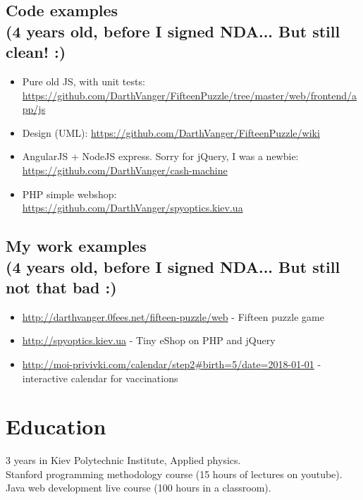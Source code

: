 \documentclass[a4paper, 14pt]{article}
\begin{document}
  \subsection{Code examples \\(4 years old, before I signed NDA... But still clean! :)}
  \begin{itemize}
    \item Pure old JS, with unit tests: \url{https://github.com/DarthVanger/FifteenPuzzle/tree/master/web/frontend/app/js}
    \\
  \item Design (UML): \url{https://github.com/DarthVanger/FifteenPuzzle/wiki}
    \\
    \item AngularJS + NodeJS express. Sorry for jQuery, I was a newbie:\\
      \url{https://github.com/DarthVanger/cash-machine} \\
    \item PHP simple webshop:\\
      \url{https://github.com/DarthVanger/spyoptics.kiev.ua} \\
\end{itemize}

  \subsection{My work examples \\(4 years old, before I signed NDA... But still not that bad :)}
  \begin{itemize}
    \item \url{http://darthvanger.0fees.net/fifteen-puzzle/web} - Fifteen puzzle game
    \\
    \item \url{http://spyoptics.kiev.ua} - Tiny eShop on PHP and jQuery
    \\
    \item \url{http://moi-privivki.com/calendar/step2#birth=5/date=2018-01-01} - interactive calendar for vaccinations
  \end{itemize}

\section{Education}
	3 years in Kiev Polytechnic Institute, Applied physics. \\
	Stanford programming methodology course (15 hours of lectures on youtube). \\
	Java web development live course (100 hours in a classroom).
\end{document}

